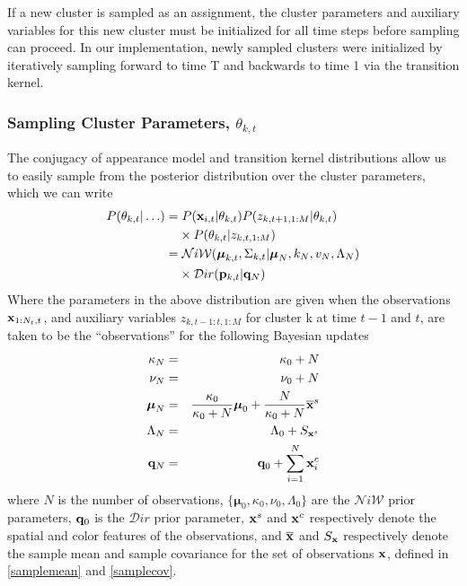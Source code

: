 \documentclass[twocolumn, final]{svjour3}
\begin{document}
If a new cluster is sampled as an assignment, the cluster parameters and auxiliary variables for this new cluster must be initialized for all time steps before sampling can proceed. In our implementation, newly sampled clusters were initialized by iteratively sampling forward to time T and backwards to time 1 via the transition kernel.



\subsubsection{Sampling Cluster Parameters, $\theta_{k, t}$}

The conjugacy of appearance model and transition kernel distributions allow us to easily sample from the posterior distribution over the cluster parameters, which we can write
\begin{align}
\begin{split}
P(\theta_{k,t} | \ldots ) = & \hspace{1mm} P(\bold{x}_{i,t} | \theta_{k,t}) P(z_{k,t+1,1:M} | \theta_{k,t})
\\ & \times P(\theta_{k,t} | z_{k,t,1:M}) \\
 = & \hspace{1mm} \mathcal{N}i\mathcal{W}(\boldsymbol{\mu}_{k,t}, \Sigma_{k,t} | \boldsymbol{\mu}_{N}, k_{N}, v_{N}, \Lambda_{N}) \\
  & \times \mathcal{D}ir( \bold{p}_{k,t} | \bold{q}_{N})
\end{split}
\end{align}
Where the parameters in the above distribution are given when the observations $\bold{x}_{1:N_{t},t}$, and auxiliary variables $z_{k,t-1:t,1:M}$ for cluster k at time $t-1$ and $t$, are taken to be the ``observations'' for the following Bayesian updates
\begin{eqnarray}
\label{bayesian_update_1}
\kappa_{N} &=& \kappa_{0} + N \\
\label{bayesian_update_2}
\nu_{N} &=& \nu_{0} + N \\
\label{bayesian_update_3}
\boldsymbol{\mu}_{N} &=& \frac{\kappa_{0}}{\kappa_{0}+N} \boldsymbol{\mu}_{0}  +  \frac{N}{\kappa_{0}+N} \overline{\bold{x}}^{s}\\
\Lambda_{N} &=& \Lambda_{0} + S_{\bold{x}^{s}}\\
\label{bayesian_update_4}
\bold{q}_{N} &=& \bold{q}_{0} + \sum_{i=1}^{N} \bold{x}_{i}^{c}
\end{eqnarray}
where $N$ is the number of observations, $\{ \boldsymbol{\mu}_{0}, \kappa_{0}, \nu_{0}, \Lambda_{0} \}$ are the $\mathcal{N}i\mathcal{W}$ prior parameters, $\bold{q}_{0}$ is the $\mathcal{D}ir$ prior parameter, $\bold{x}^{s}$ and $\bold{x}^{c}$ respectively denote the spatial and color features of the observations, and $\overline{\bold{x}}$ and $S_{\bold{x}}$ respectively denote the sample mean and sample covariance for the set of observations $\bold{x}$, defined in \eqref{samplemean} and \eqref{samplecov}.
\end{document}

